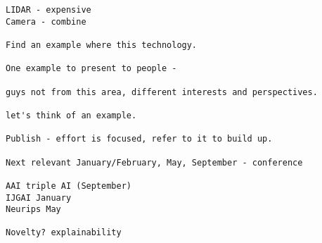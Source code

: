 \begin{verbatim}
LIDAR - expensive
Camera - combine

Find an example where this technology.

One example to present to people -

guys not from this area, different interests and perspectives.

let's think of an example.

Publish - effort is focused, refer to it to build up.

Next relevant January/February, May, September - conference

AAI triple AI (September)
IJGAI January
Neurips May

Novelty? explainability


\end{verbatim}